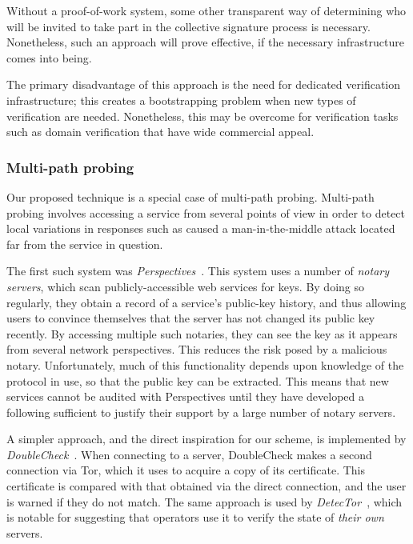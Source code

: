 \documentclass[USenglish]{llncs}
\begin{document}
Without a proof-of-work system, some other transparent way of determining who will be invited to
take part in the collective signature process is necessary.  Nonetheless, such an
approach will prove effective, if the necessary infrastructure comes into being.

The primary disadvantage of this approach is the need for dedicated verification
infrastructure; this creates a bootstrapping problem when new types of verification
are needed.  Nonetheless, this may be overcome for verification tasks such as
domain verification that have wide commercial appeal.

\subsubsection{Multi-path probing}

Our proposed technique is a special case of multi-path probing.  Multi-path probing
involves accessing a service from several points of view in order to detect local variations
in responses such as caused a man-in-the-middle attack located far from
the service in question.  

The first such system was \emph{Perspectives}~\cite{wendlandt-tofu}.  This system
uses a number of \emph{notary servers}, which scan publicly-accessible web services for
keys.  By doing so regularly, they obtain a record of a service's public-key history, and thus
allowing users to convince themselves that the server has not changed its public key
recently.  By accessing multiple such notaries, they can see the key as it appears from
several network perspectives.  This reduces the risk posed by a malicious notary.
Unfortunately, much of this functionality depends upon knowledge of the protocol in
use, so that the public key can be extracted.  This means that new services cannot
be audited with Perspectives until they have developed a following sufficient to justify
their support by a large number of notary servers.

A simpler approach, and the direct inspiration for our scheme, is implemented by
\emph{DoubleCheck}~\cite{doublecheck}.  When connecting to a server, DoubleCheck
makes a second connection via Tor, which it uses to acquire a copy of its certificate.  This
certificate is compared with that obtained via the direct connection, and the user is warned
if they do not match.  The same approach is used by \emph{DetecTor}~\cite{detector},
which is notable for suggesting that operators use it to verify the state of \emph{their own}
servers.
\end{document}
